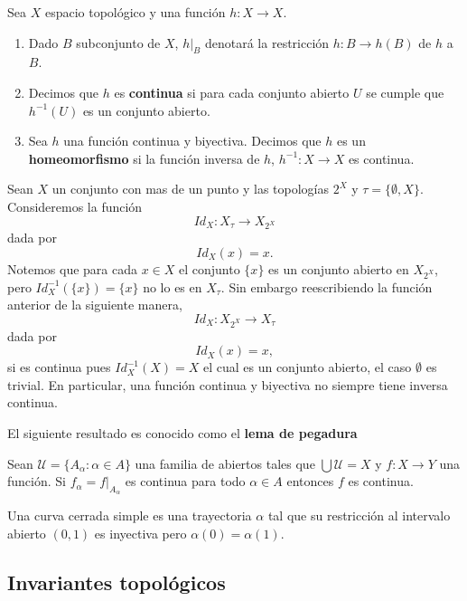 \begin{df}
Sea $X$ espacio topológico y una función $h:X \to X$. 
\begin{enumerate}

	\item Dado $B$ subconjunto de $X$, $h|_B$ denotará la restricción $h:B \to h(B)$ de $h$ a $B$. 
	
	\item  Decimos que $h$ es \textbf{continua} si para cada conjunto abierto $U$ se cumple que $h^{-1}(U)$ es un conjunto abierto.
	
	\item  Sea $h$ una función continua y biyectiva. Decimos que $h$ es un \textbf{homeomorfismo} si la función inversa de $h$, $h^{-1}:X \to X$ es continua. 	
\end{enumerate}
\end{df}


\begin{ej}
Sean $X$ un conjunto con mas de un punto y las topologías $2^X$ y $\tau=\{\emptyset, X\}$. Consideremos la función $$Id_X:X_{\tau} \to X_{2^X}$$ dada por $$Id_X(x)=x.$$
Notemos que para cada $x \in X$ el conjunto $\{x\}$ es un conjunto abierto en $X_{2^X}$, pero $Id_X^{-1}(\{x\})= \{x\}$ no lo es en $X_\tau$. Sin embargo reescribiendo  la función anterior de la siguiente manera,  $$Id_X:X_{2^X} \to X_{\tau}$$ dada por $$Id_X(x)=x,$$
si es continua pues $Id_X^{-1}(X)=X$ el cual es un conjunto abierto, el caso $\emptyset$ es trivial. En particular, una función continua y biyectiva no siempre tiene inversa continua. 
\end{ej}

El siguiente resultado es conocido como el \textbf{lema de pegadura}

\begin{pr}
Sean $\mathcal{U}= \{A_\alpha :\alpha \in A\}$ una familia de abiertos tales que $\bigcup \mathcal{U} = X$ y $f:X \to Y$ una función. Si $f_\alpha=f|_{A_\alpha}$ es continua para todo $\alpha \in A$ entonces $f$ es continua.  
\end{pr}


Una curva cerrada simple es una trayectoria $\alpha$ tal que su restricción al intervalo abierto $(0,1)$ es inyectiva pero $\alpha(0)= \alpha(1)$. 

\subsection*{Invariantes topológicos}


